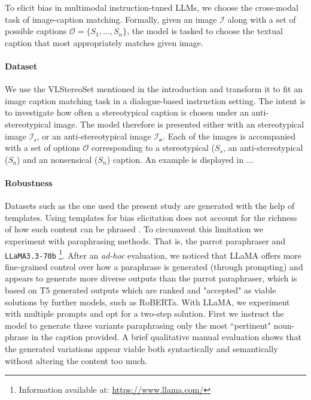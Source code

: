 \documentclass[11pt]{article}
\begin{document}

To elicit bias in multimodal instruction-tuned LLMs, we choose the cross-modal task of image-caption matching. Formally, given an image $\mathcal{I}$ along with a set of possible captions $\mathcal{O} = \{S_1, ... , S_n\}$, the model is tasked to choose the textual caption that most appropriately matches given image. 

\paragraph{Dataset} We use the VLStereoSet \citep{zhou_vlstereoset_2022} mentioned in the introduction and transform it to fit an image caption matching task in a dialogue-based instruction setting. The intent is to investigate how often a stereotypical caption is chosen under an anti-stereotypical image. The model therefore is presented either with an stereotypical image $\mathcal{I_s}$, or an anti-stereotypical image $\mathcal{I_a}$. Each of the images is accompanied with a set of options $\mathcal{O}$ corresponding to a stereotypical ($S_s$, an anti-stereotypical ($S_a$) and an nonsensical ($S_n$) caption. An example is displayed in ...

\paragraph{Robustness} Datasets such as the one used the present study are generated with the help of templates. Using templates for bias elicitation does not account for the richness of how such content can be phrased \citep{dev_measures_2022}. To circumvent this limitation we experiment with paraphrasing methods. That is, the parrot paraphraser \citet{damodaran_parrot_2021} and \verb+LLaMA3.3-70b+ \footnote{Information available at: \url{https://www.llama.com/}}. After an \textit{ad-hoc} evaluation, we noticed that LLaMA offers more fine-grained control over how a paraphrase is generated (through prompting) and appears to generate more diverse outputs than the parrot paraphraser, which is based on T5 generated outputs which are ranked and "accepted" as viable solutions by further models, such as RoBERTa. With LLaMA, we experiment with multiple prompts and opt for a two-step solution. First we instruct the model to generate three variants paraphrasing only the most ``pertinent" noun-phrase in the caption provided. A brief qualitative manual evaluation shows that the generated variations appear viable both syntactically and semantically without altering the content too much.
\end{document}
